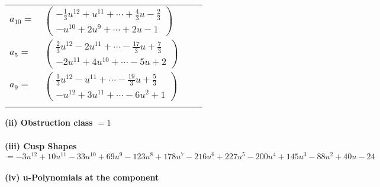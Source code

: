 \documentclass[1p]{elsarticle_modified}
\theoremstyle{definition}
\begin{document}
\begin{tabular}{m{7pt} m{180pt} m{7pt} m{180pt} }
\flushright $a_{10}=$&$\begin{pmatrix}-\frac{1}{3} u^{12}+u^{11}+\cdots+\frac{4}{3} u-\frac{2}{3}\\- u^{10}+2 u^9+\cdots+2 u-1\end{pmatrix}$ \\
\flushright $a_{5}=$&$\begin{pmatrix}\frac{2}{3} u^{12}-2 u^{11}+\cdots-\frac{17}{3} u+\frac{7}{3}\\-2 u^{11}+4 u^{10}+\cdots-5 u+2\end{pmatrix}$ \\
\flushright $a_{9}=$&$\begin{pmatrix}\frac{1}{3} u^{12}- u^{11}+\cdots-\frac{19}{3} u+\frac{5}{3}\\- u^{12}+3 u^{11}+\cdots-6 u^2+1\end{pmatrix}$\\&\end{tabular}
\flushleft \textbf{(ii) Obstruction class $= 1$}\\~\\
\flushleft \textbf{(iii) Cusp Shapes $= -3 u^{12}+10 u^{11}-33 u^{10}+69 u^9-123 u^8+178 u^7-216 u^6+227 u^5-200 u^4+145 u^3-88 u^2+40 u-24$}\\~\\
\newpage\renewcommand{\arraystretch}{1}
\flushleft \textbf{(iv) u-Polynomials at the component}\newline \\
\end{document}
